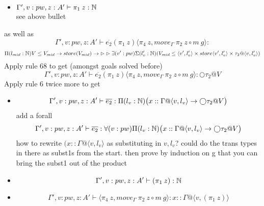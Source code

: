 \documentclass{article}
\begin{document}
\begin{itemize}
\begin{itemize}
\begin{itemize}
\begin{itemize}
        \item $\Gamma', v: pw, z:A'  \vdash \pi_1 \: z : \mathbb{N} $\\
        see above bullet
    \end{itemize}
    as well as
    \[\Gamma', v: pw, z:A'  \vdash \overline{e_2} (\pi_1 \: z)
\langle \pi_4 \: z, move_\Gamma \: \pi_2 \: z \circ m \: g \rangle :\] 
    \[\Pi(l_{mid} : \mathbb{N}) V \leq V_{mid} \rightarrow store(V_{mid}) \rightarrow \rhd \rhd 
    \exists(v': pw)\Sigma(l_v' : \mathbb{N})(V_{mid} \leq \langle v', l_v' \rangle \times store\langle v', l_v' \rangle \times \tau_2 @ \langle v, l_v' \rangle)\]
    Apply rule 68 to get (amongst goals solved before)
        \[\Gamma', v: pw, z:A'  \vdash \overline{e_2} (\pi_1 \: z)
\langle \pi_4 \: z, move_{\Gamma} \: \pi_2 \: z \circ m \: g \rangle  : \bigcirc \tau_2 @ V\] 
    Apply rule 6 twice more to get
    \begin{itemize}
        \item 
        \[\Gamma', v: pw, z:A'  \vdash \overline{e_2} :\Pi(l_v: \mathbb{N})\big(x::\Gamma @ \langle v, l_v \rangle \rightarrow \bigcirc \tau_2 @ V\big)\]
        add a forall
         \[\Gamma', v: pw, z:A'  \vdash \overline{e_2} :
         \forall(v: pw)\Pi(l_v: \mathbb{N})\big(x::\Gamma @ \langle v, l_v \rangle \rightarrow \bigcirc \tau_2 @ V\big)\]
        how to rewrite $(x::\Gamma @ \langle v, l_v \rangle$ as substituting in $v, l_v$?
        could do the trans types in there as subst1s from the start. then prove by induction on g that you can bring the subst1 out of the product
        \item 
        \[\Gamma', v: pw, z:A'  \vdash (\pi_1 \: z) : \mathbb{N}\]
        \item \[\Gamma', v: pw, z:A'  \vdash \langle \pi_4 \: z, move_\Gamma \: \pi_2 \: z \circ m \: g \rangle : 
 x::\Gamma @ \langle v, (\pi_1 \: z) \rangle
        \]
    \end{itemize}
    
    
    

\end{itemize}
\end{itemize}
\end{itemize}
\end{document}
